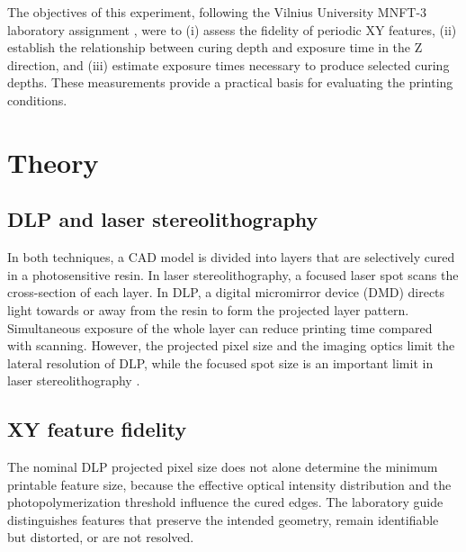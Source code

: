 \documentclass[10pt]{article}
\begin{document}
The objectives of this experiment, following the Vilnius University MNFT-3 laboratory assignment \cite{vilnius2020mnft3}, were to (i) assess the fidelity of periodic XY features, (ii) establish the relationship between curing depth and exposure time in the Z direction, and (iii) estimate exposure times necessary to produce selected curing depths. These measurements provide a practical basis for evaluating the printing conditions.

\section{Theory}
\subsection{DLP and laser stereolithography}
In both techniques, a CAD model is divided into layers that are selectively cured in a photosensitive resin. In laser stereolithography, a focused laser spot scans the cross-section of each layer. In DLP, a digital micromirror device (DMD) directs light towards or away from the resin to form the projected layer pattern. Simultaneous exposure of the whole layer can reduce printing time compared with scanning. However, the projected pixel size and the imaging optics limit the lateral resolution of DLP, while the focused spot size is an important limit in laser stereolithography \cite{vilnius2020mnft3}.

\subsection{XY feature fidelity}
The nominal DLP projected pixel size does not alone determine the minimum printable feature size, because the effective optical intensity distribution and the photopolymerization threshold influence the cured edges. The laboratory guide \cite{vilnius2020mnft3} distinguishes features that preserve the intended geometry, remain identifiable but distorted, or are not resolved.
\end{document}
